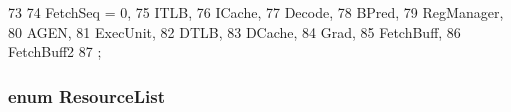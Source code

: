 \begin{DoxyCode}
73                       {
74        FetchSeq = 0,
75        ITLB,
76        ICache,
77        Decode,
78        BPred,
79        RegManager,
80        AGEN,
81        ExecUnit,
82        DTLB,
83        DCache,
84        Grad,
85        FetchBuff,
86        FetchBuff2
87     };
\end{DoxyCode}
\hypertarget{namespaceThePipeline_a20c49520a50d0b1ad56baad8ba94d3d1}{
\subsubsection[{ResourceList}]{\setlength{\rightskip}{0pt plus 5cm}enum {\bf ResourceList}}}
\label{namespaceThePipeline_a20c49520a50d0b1ad56baad8ba94d3d1}
